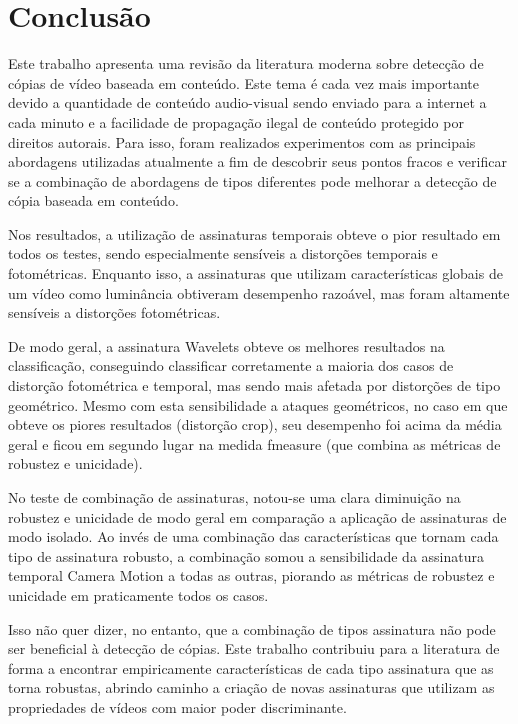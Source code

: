 
\chapter{Conclusão}
\label{chap:conclusao}

Este trabalho apresenta uma revisão da literatura moderna sobre detecção de cópias de vídeo baseada em conteúdo. Este tema é cada vez mais importante devido a quantidade de conteúdo audio-visual sendo enviado para a internet a cada minuto e a facilidade de propagação ilegal de conteúdo protegido por direitos autorais. Para isso, foram realizados experimentos com as principais abordagens utilizadas atualmente a fim de descobrir seus pontos fracos e verificar se a combinação de abordagens de tipos diferentes pode melhorar a detecção de cópia baseada em conteúdo.

Nos resultados, a utilização de assinaturas temporais obteve o pior resultado em todos os testes, sendo especialmente sensíveis a distorções temporais e fotométricas. Enquanto isso, a assinaturas que utilizam características globais de um vídeo como luminância obtiveram desempenho razoável, mas foram altamente sensíveis a distorções fotométricas.

De modo geral, a assinatura Wavelets obteve os melhores resultados na classificação, conseguindo classificar corretamente a maioria dos casos de distorção fotométrica e temporal, mas sendo mais afetada por distorções de tipo geométrico. Mesmo com esta sensibilidade a ataques geométricos, no caso em que obteve os piores resultados (distorção crop), seu desempenho foi acima da média geral e ficou em segundo lugar na medida fmeasure (que combina as métricas de robustez e unicidade).

No teste de combinação de assinaturas, notou-se uma clara diminuição na robustez e unicidade de modo geral em comparação a aplicação de assinaturas de modo isolado. Ao invés de uma combinação das características que tornam cada tipo de assinatura robusto, a combinação somou a sensibilidade da assinatura temporal Camera Motion a todas as outras, piorando as métricas de robustez e unicidade em praticamente todos os casos.

Isso não quer dizer, no entanto, que a combinação de tipos assinatura não pode ser beneficial à detecção de cópias. Este trabalho contribuiu para a literatura de forma a encontrar empiricamente características de cada tipo assinatura que as torna robustas, abrindo caminho a criação de novas assinaturas que utilizam as propriedades de vídeos com maior poder discriminante.


